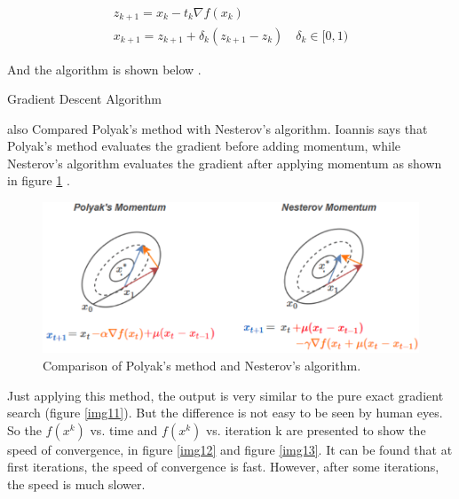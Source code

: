 \documentclass{article}
\makeatletter
\def\BState{\State\hskip-\ALG@thistlm}
\makeatother
\begin{document}
$$
\begin{array}{l}
z_{k+1}=x_{k}-t_{k} \nabla f\left(x_{k}\right) \\
x_{k+1}=z_{k+1}+\delta_{k}\left(z_{k+1}-z_{k}\right) \quad \delta_{k} \in[0,1)
\end{array}
$$

And the algorithm is shown below \citep{Ioannis2018}.

\begin{algorithm}
\caption{Gradient Descent Algorithm}\label{alg1}
\begin{algorithmic}
\BState \emph{given} a starting point $x \in \operatorname{dom} f$, learning rate $\delta_{k}$
\BState \emph{repeat}:
\State 1. $z_{k+1}=x_{k}-t_{k} \nabla f\left(x_{k}\right)$
\State 2. $x_{k+1}=z_{k+1}+\delta_{k}\left(z_{k+1}-z_{k}\right) \quad \delta_{k} \in[0,1)$
\State 3. Line search. Choose step size $t$ via exact or backtracking line search.
\State 4. Update. $x:=x_{k+1}(t_{k})$ 
\BState \emph{until} stopping criterion is satisfied.
\EndProcedure
\end{algorithmic}
\end{algorithm}

\citet{Ioannis2018} also Compared Polyak’s method with Nesterov’s algorithm. Ioannis says that Polyak’s method evaluates the gradient before adding momentum, while Nesterov’s algorithm evaluates the gradient after applying momentum as shown in figure \ref{img10} \citep{Ioannis2018}.

\begin{figure}[h]
  \includegraphics[width=4.5in]{pic10.png}
  \centering
  \caption{Comparison of Polyak’s method and Nesterov’s algorithm.}
  \label{img10}
\end{figure}

Just applying this method, the output is very similar to the pure exact gradient search (figure \ref{img11}). But the difference is not easy to be seen by human eyes. So the $f(x^{k})$ vs. time and  $f(x^{k})$ vs. iteration k are presented to show the speed of convergence, in figure \ref{img12} and figure \ref{img13}. It can be found that at first iterations, the speed of convergence is fast. However, after some iterations, the speed is much slower.
\end{document}
